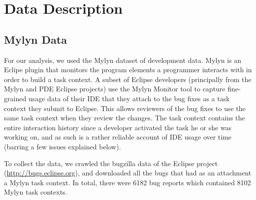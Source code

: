 \documentclass[conference]{IEEEtran}
\begin{document}





\section{Data Description}

\subsection{Mylyn Data}
For our analysis, we used the Mylyn dataset of development data.  Mylyn \cite{KM06} is an Eclipe plugin that monitors the program elements a programmer interacts with in order to build a task context. A subset of Eclipse developers (principally from the Mylyn and PDE Eclipse projects) use the Mylyn Monitor tool to capture fine-grained usage data of their IDE that they attach to the bug fixes as a task context they submit to Eclipse. This allows reviewers of the bug fixes to use the same task context when they review the changes. The task context contains the entire interaction history since a developer activated the task he or she was working on, and as such is a rather reliable account of IDE usage over time (barring a few issues explained below).


To collect the data, we crawled the bugzilla data of the Eclipse project (\url{http://bugs.eclipse.org}), and downloaded all the bugs that had as an attachment a Mylyn task context.  In total, there were 6182 bug reports which contained 8102 Mylyn task contexts.
\end{document}
